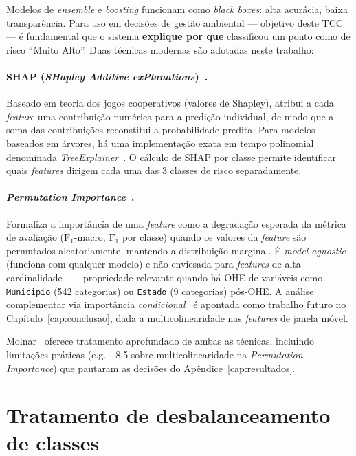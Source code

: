 \documentclass[tcc2]{uftex}
\begin{document}
Modelos de \emph{ensemble} e \emph{boosting} funcionam como \emph{black boxes}: alta acurácia, baixa transparência. Para uso em decisões de gestão ambiental --- objetivo deste TCC --- é fundamental que o sistema \textbf{explique por que} classificou um ponto como de risco ``Muito Alto''. Duas técnicas modernas são adotadas neste trabalho:

\paragraph{SHAP (\emph{SHapley Additive exPlanations})~\cite{lundberg2017unified}.} Baseado em teoria dos jogos cooperativos (valores de Shapley), atribui a cada \emph{feature} uma contribuição numérica para a predição individual, de modo que a soma das contribuições reconstitui a probabilidade predita. Para modelos baseados em árvores, há uma implementação exata em tempo polinomial denominada \emph{TreeExplainer}~\cite{lundberg2020local}. O cálculo de SHAP por classe permite identificar quais \emph{features} dirigem cada uma das 3 classes de risco separadamente.

\paragraph{\emph{Permutation Importance}~\cite{breiman2001random,fisher2019all}.} Formaliza a importância de uma \emph{feature} como a degradação esperada da métrica de avaliação (\(\text{F}_1\)-macro, \(\text{F}_1\) por classe) quando os valores da \emph{feature} são permutados aleatoriamente, mantendo a distribuição marginal. É \emph{model-agnostic} (funciona com qualquer modelo) e não enviesada para \emph{features} de alta cardinalidade~\cite{strobl2007bias} --- propriedade relevante quando há OHE de variáveis como \texttt{Municipio} (542 categorias) ou \texttt{Estado} (9 categorias) pós-OHE. A análise complementar via importância \emph{condicional}~\cite{hooker2021unrestricted} é apontada como trabalho futuro no Capítulo~\ref{cap:conclusao}, dada a multicolinearidade nas \emph{features} de janela móvel.

Molnar~\cite{molnar2022interpretable} oferece tratamento aprofundado de ambas as técnicas, incluindo limitações práticas (e.g.\ \textsection~8.5 sobre multicolinearidade na \emph{Permutation Importance}) que pautaram as decisões do Apêndice~\ref{cap:resultados}.

\section{Tratamento de desbalanceamento de classes}
\label{sec:fund_desbalanceamento}
\end{document}
